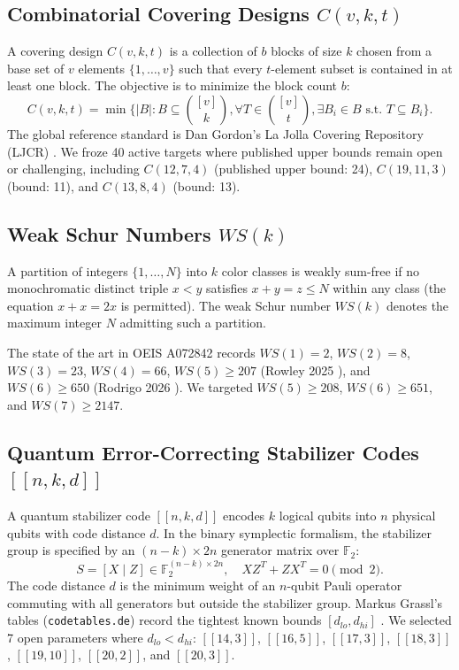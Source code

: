 \documentclass[11pt,a4paper]{article}
\begin{document}
\subsection{Combinatorial Covering Designs $C(v, k, t)$}
A covering design $C(v, k, t)$ is a collection of $b$ blocks of size $k$ chosen from a base set of $v$ elements $\{1, \dots, v\}$ such that every $t$-element subset is contained in at least one block. The objective is to minimize the block count $b$:
\begin{equation}
    C(v, k, t) = \min \{ |B| : B \subseteq \binom{[v]}{k}, \forall T \in \binom{[v]}{t}, \exists B_i \in B \text{ s.t. } T \subseteq B_i \}.
\end{equation}
The global reference standard is Dan Gordon's La Jolla Covering Repository (LJCR) \cite{gordon2026ljcr}. We froze 40 active targets where published upper bounds remain open or challenging, including $C(12, 7, 4)$ (published upper bound: 24), $C(19, 11, 3)$ (bound: 11), and $C(13, 8, 4)$ (bound: 13).

\subsection{Weak Schur Numbers $WS(k)$}
A partition of integers $\{1, \dots, N\}$ into $k$ color classes is weakly sum-free if no monochromatic distinct triple $x < y$ satisfies $x + y = z \le N$ within any class (the equation $x + x = 2x$ is permitted). The weak Schur number $WS(k)$ denotes the maximum integer $N$ admitting such a partition.

The state of the art in OEIS A072842 records $WS(1)=2$, $WS(2)=8$, $WS(3)=23$, $WS(4)=66$, $WS(5) \ge 207$ (Rowley 2025 \cite{rowley2025weakschur}), and $WS(6) \ge 650$ (Rodrigo 2026 \cite{rodrigo2026weakschur}). We targeted $WS(5) \ge 208$, $WS(6) \ge 651$, and $WS(7) \ge 2147$.

\subsection{Quantum Error-Correcting Stabilizer Codes $[[n, k, d]]$}
A quantum stabilizer code $[[n, k, d]]$ encodes $k$ logical qubits into $n$ physical qubits with code distance $d$. In the binary symplectic formalism, the stabilizer group is specified by an $(n-k) \times 2n$ generator matrix over $\mathbb{F}_2$:
\begin{equation}
    S = [X \mid Z] \in \mathbb{F}_2^{(n-k) \times 2n}, \quad X Z^T + Z X^T = 0 \pmod 2.
\end{equation}
The code distance $d$ is the minimum weight of an $n$-qubit Pauli operator commuting with all generators but outside the stabilizer group. Markus Grassl's tables (\texttt{codetables.de}) record the tightest known bounds $[d_{lo}, d_{hi}]$ \cite{grassl2026codetables}. We selected 7 open parameters where $d_{lo} < d_{hi}$: $[[14, 3]]$, $[[16, 5]]$, $[[17, 3]]$, $[[18, 3]]$, $[[19, 10]]$, $[[20, 2]]$, and $[[20, 3]]$.
\end{document}
